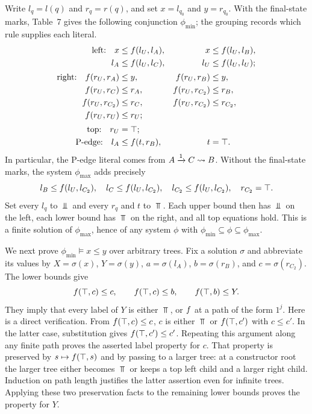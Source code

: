 Write $l_q=l(q)$ and $r_q=r(q)$, and set $x=l_{q_0}$ and $y=r_{q_0}$.
With the final-state marks, Table~7 gives the following conjunction
$\phi_{\min}$; the grouping records which rule supplies each literal.
\begin{align*}
\text{left:}\quad
 x&\le f(l_U,l_A), & x&\le f(l_U,l_B),\\
 l_A&\le f(l_U,l_C), & l_U&\le f(l_U,l_U);\\[2pt]
\text{right:}\quad
 f(r_U,r_A)&\le y, & f(r_U,r_B)&\le y,\\
 f(r_U,r_C)&\le r_A, & f(r_U,r_{C_2})&\le r_B,\\
 f(r_U,r_{C_2})&\le r_C, & f(r_U,r_{C_2})&\le r_{C_2},\\
 f(r_U,r_U)&\le r_U;\\[2pt]
\text{top:}\quad r_U&=\top;\\
\text{P-edge:}\quad l_A&\le f(t,r_B), & t&=\top.
\end{align*}
In particular, the P-edge literal comes from
$A\xrightarrow{1}C\rightsquigarrow B$.
Without the final-state marks, the system $\phi_{\max}$ adds precisely
\[
 l_B\le f(l_U,l_{C_2}),\quad
 l_C\le f(l_U,l_{C_2}),\quad
 l_{C_2}\le f(l_U,l_{C_2}),\quad r_{C_2}=\top.
\]
Set every $l_q$ to $\Bot$ and every $r_q$ and $t$ to $\Top$.
Each upper bound then has $\Bot$ on the left, each lower bound has
$\Top$ on the right, and all top equations hold. This is a finite
solution of $\phi_{\max}$, hence of any system $\phi$ with
$\phi_{\min}\subseteq\phi\subseteq\phi_{\max}$.

We next prove $\phi_{\min}\models x\le y$ over arbitrary trees.
Fix a solution $\sigma$ and abbreviate its values by
$X=\sigma(x)$, $Y=\sigma(y)$, $a=\sigma(l_A)$,
$b=\sigma(r_B)$, and $c=\sigma(r_{C_2})$.
The lower bounds give
\[
 f(\top,c)\le c,\qquad
 f(\top,c)\le b,\qquad
 f(\top,b)\le Y.
\]
They imply that every label of $Y$ is either $\Top$, or $f$ at a
path of the form $1^j$. Here is a direct verification.
From $f(\top,c)\le c$, $c$ is either $\Top$ or
$f(\top,c')$ with $c\le c'$. In the latter case,
substitution gives $f(\top,c')\le c'$. Repeating this argument
along any finite path proves the asserted label property for $c$.
That property is preserved by $s\mapsto f(\top,s)$ and by passing
to a larger tree: at a constructor root the larger tree either becomes
$\Top$ or keeps a top left child and a larger right child.
Induction on path length justifies the latter assertion even for infinite
trees. Applying these two preservation facts to the remaining lower
bounds proves the property for $Y$.


